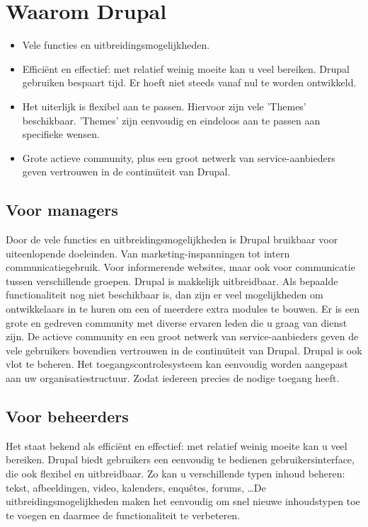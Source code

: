 \section{Waarom Drupal}
\begin{itemize}
  \item Vele functies en uitbreidingsmogelijkheden.
  \item Effici\"ent en effectief: met relatief weinig moeite kan u veel
  bereiken. Drupal gebruiken bespaart tijd. Er hoeft niet steeds vanaf nul te worden ontwikkeld.
  \item Het uiterlijk is flexibel aan te passen. Hiervoor zijn vele 'Themes'
  beschikbaar. 'Themes' zijn eenvoudig en eindeloos aan te passen aan specifieke wensen.
  \item Grote actieve community, plus een groot netwerk van service-aanbieders
  geven vertrouwen in de continu\"\i teit van Drupal.
\end{itemize}

\subsection{Voor managers}
Door de vele functies en uitbreidingsmogelijkheden is Drupal bruikbaar voor
uiteenlopende doeleinden. Van marketing-inspanningen tot intern communicatiegebruik. 
Voor informerende websites, maar ook voor communicatie tussen verschillende groepen. 
Drupal is makkelijk uitbreidbaar. Als bepaalde functionaliteit nog niet beschikbaar is, 
dan zijn er veel mogelijkheden om ontwikkelaars in te huren om een of meerdere extra 
modules te bouwen. Er is een grote en gedreven community met diverse ervaren leden 
die u graag van dienst zijn. De actieve community en een groot netwerk van 
service-aanbieders geven de vele gebruikers bovendien vertrouwen in de
continu\"\i teit van Drupal. Drupal is ook vlot te beheren. Het
toegangscontrolesysteem kan eenvoudig worden aangepast aan uw organisatiestructuur. 
Zodat iedereen precies de nodige toegang heeft.

\subsection{Voor beheerders}
Het staat bekend als effici\"ent en effectief: met relatief weinig moeite kan
u veel bereiken. Drupal biedt gebruikers een eenvoudig te bedienen
gebruikersinterface, die ook flexibel en uitbreidbaar. Zo kan u
verschillende typen inhoud beheren: tekst, afbeeldingen, video, kalenders, enqu\^etes, forums,
\ldots De uitbreidingsmogelijkheden maken het eenvoudig om snel nieuwe inhoudstypen toe
te voegen en daarmee de functionaliteit te verbeteren.

